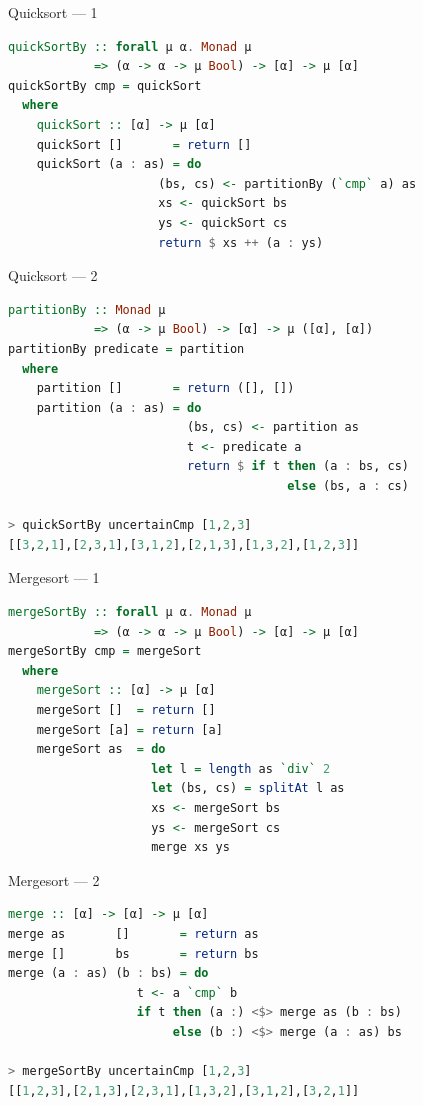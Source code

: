 \documentclass[handout]{beamer}
\begin{document}
\begin{frame}[fragile]{Quicksort --- 1}

\begin{lstlisting}[language=Haskell]
quickSortBy :: forall μ α. Monad μ
            => (α -> α -> μ Bool) -> [α] -> μ [α]
quickSortBy cmp = quickSort
  where
    quickSort :: [α] -> μ [α]
    quickSort []       = return []
    quickSort (a : as) = do
                     (bs, cs) <- partitionBy (`cmp` a) as
                     xs <- quickSort bs
                     ys <- quickSort cs
                     return $ xs ++ (a : ys)
\end{lstlisting}

\end{frame}

\begin{frame}[fragile]{Quicksort --- 2}

\begin{lstlisting}[language=Haskell]
partitionBy :: Monad μ
            => (α -> μ Bool) -> [α] -> μ ([α], [α])
partitionBy predicate = partition
  where
    partition []       = return ([], [])
    partition (a : as) = do
                         (bs, cs) <- partition as
                         t <- predicate a
                         return $ if t then (a : bs, cs)
                                       else (bs, a : cs)

> quickSortBy uncertainCmp [1,2,3]
[[3,2,1],[2,3,1],[3,1,2],[2,1,3],[1,3,2],[1,2,3]]
\end{lstlisting}

\end{frame}

\begin{frame}[fragile]{Mergesort --- 1}

\begin{lstlisting}[language=Haskell]
mergeSortBy :: forall μ α. Monad μ
            => (α -> α -> μ Bool) -> [α] -> μ [α]
mergeSortBy cmp = mergeSort
  where
    mergeSort :: [α] -> μ [α]
    mergeSort []  = return []
    mergeSort [a] = return [a]
    mergeSort as  = do
                    let l = length as `div` 2
                    let (bs, cs) = splitAt l as
                    xs <- mergeSort bs
                    ys <- mergeSort cs
                    merge xs ys
\end{lstlisting}

\end{frame}

\begin{frame}[fragile]{Mergesort --- 2}

\begin{lstlisting}[language=Haskell]
merge :: [α] -> [α] -> μ [α]
merge as       []       = return as
merge []       bs       = return bs
merge (a : as) (b : bs) = do
                  t <- a `cmp` b
                  if t then (a :) <$> merge as (b : bs)
                       else (b :) <$> merge (a : as) bs

> mergeSortBy uncertainCmp [1,2,3]
[[1,2,3],[2,1,3],[2,3,1],[1,3,2],[3,1,2],[3,2,1]]
\end{lstlisting}

\end{frame}
\end{document}
